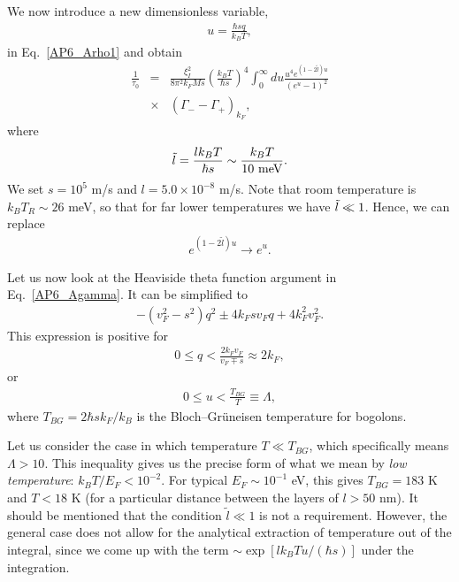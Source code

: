 We now introduce a new dimensionless variable,
%
\begin{eqnarray}
\label{AP6_Dim}
u=\frac{\hbar sq}{k_BT},
\end{eqnarray}
%
in Eq.~\eqref{AP6_Arho1} and obtain
%
\begin{eqnarray}
\label{AP6_Arho2}
\frac{1}{\tau_0}&=&\frac{\xi_I^2}{8\pi^2k_FMs}\left(\frac{k_BT}{\hbar s}\right)^4\int_0^\infty du \frac{u^4e^{(1-2\tilde{l})u}}{(e^u-1)^2}\nonumber\\
&\times&(\Gamma_--\Gamma_+)_{k_F},
\end{eqnarray}
%
where
%
\begin{eqnarray}
\Tilde{l}=\frac{lk_BT}{\hbar s}\sim\frac{k_BT}{10\mbox{ meV}}.
\end{eqnarray}
%
We set $s=10^5$ m/s and $l= 5.0\times 10^{-8}$ m/s. 
%
Note that room temperature is $k_BT_R\sim 26$ meV, so that for far lower temperatures we have $\Tilde{l}\ll 1$. Hence, we can replace
%
\begin{eqnarray}
\label{AP6_approx1}
e^{(1-2\tilde{l})u}\rightarrow e^u.
\end{eqnarray}
%

Let us now look at the Heaviside theta function argument in Eq.~\eqref{AP6_Agamma}. It can be simplified to
%
\begin{eqnarray}
-(v_F^2-s^2)q^2\pm 4k_Fsv_Fq+4k_F^2v_F^2.
\end{eqnarray}
%
This expression is positive for
%
\begin{eqnarray}
0\leq q<\frac{2k_Fv_F}{v_F\mp s}\approx 2k_F,
\end{eqnarray}
%
or
%
\begin{eqnarray}
\label{AP6_Alambda}
0\leq u<\frac{T_{BG}}{T}\equiv\Lambda,
\end{eqnarray}
%
where $T_{BG}=2\hbar sk_F/k_B$ is the Bloch--Gr\"{u}neisen temperature for bogolons.

Let us consider the case in which temperature $T\ll T_{BG}$, which specifically means $\Lambda >10$. This inequality gives us the precise form of what we mean by \textit{low temperature}: $k_BT/E_F<10^{-2}$. For typical $E_F\sim 10^{-1}$ eV, this gives $T_{BG}=183$ K and  $T<18$ K (for a particular distance between the layers of $l>50$ nm). 
%
It should be mentioned that the condition $\tilde{l}\ll 1$ is not a requirement. However, the general case does not allow for the analytical extraction of temperature out of the integral, since we come up with the term $\sim\exp[lk_BTu/(\hbar s)]$ under the integration.

